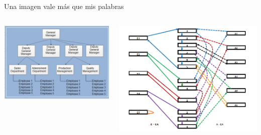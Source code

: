 \begin{frame}{Una imagen vale m\'as que mis palabras}
    \begin{columns}
        \centering
        \includegraphics[width=\textwidth]{img/Hierarchical-Model.jpg}

            \centering
            \includegraphics[width=\textwidth, height=0.8\textheight]{img/reticular.png}
    \end{columns}
\end{frame}




